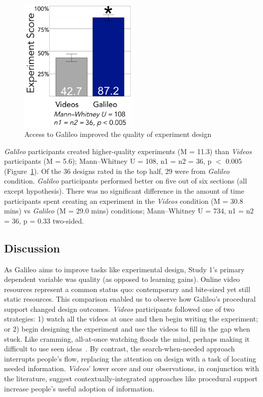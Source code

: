 \begin{figure}[h]
\centering
  \includegraphics[width=0.5\textwidth]{figures/galileo/galileo-study1-7}
  \caption[Access to Galileo improved the quality of experiment design]
{Access to Galileo improved the quality of experiment design}
  \label{fig:galileo-7-result}
\end{figure}

\textit{Galileo} participants created higher-quality experiments (M = 11.3) than \textit{Videos} participants (M = 5.6); Mann–Whitney U = 108, n1 = n2 = 36, p $<$ 0.005 (Figure~\ref{fig:galileo-7-result}). Of the 36 designs rated in the top half, 29 were from \textit{Galileo} condition. \textit{Galileo} participants performed better on five out of six sections (all except hypothesis). There was no significant difference in the amount of time participants spent creating an experiment in the \textit{Videos} condition (M = 30.8 mins) vs \textit{Galileo} (M = 29.0 mins) conditions; Mann–Whitney U = 734, n1 = n2 = 36, p = 0.33 two-sided. 

\subsection*{Discussion}
As Galileo aims to improve tasks like experimental design, Study 1's primary dependent variable was quality (as opposed to learning gains). Online video resources represent a common status quo: contemporary and bite-sized yet still static resources. This comparison enabled us to observe how Galileo's procedural support changed design outcomes. \textit{Videos} participants followed one of two strategies: 1) watch all the videos at once and then begin writing the experiment; or 2) begin designing the experiment and use the videos to fill in the gap when stuck. Like cramming, all-at-once watching floods the mind, perhaps making it difficult to use seen ideas~\cite{kornell2009optimising}. By contrast, the search-when-needed approach interrupts people's flow, replacing the attention on design with a task of locating needed information. \textit{Videos}' lower score and our observations, in conjunction with the literature, suggest contextually-integrated approaches like procedural support increase people's useful adoption of information.
   

